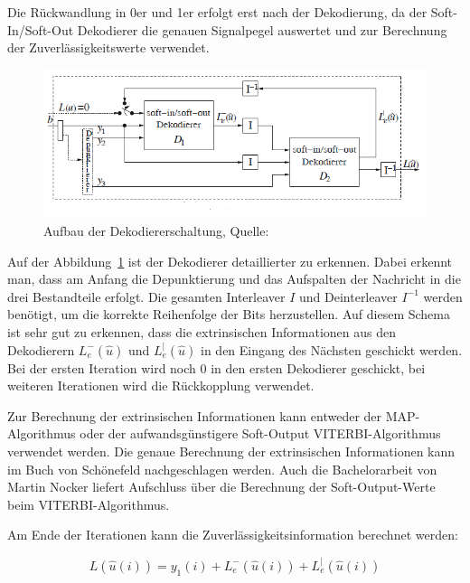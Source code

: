Die Rückwandlung in 0er und 1er erfolgt erst nach der Dekodierung, da der Soft-In/Soft-Out Dekodierer die genauen Signalpegel auswertet und zur Berechnung der Zuverlässigkeitswerte verwendet. 

\begin{figure}[th]
\centering
\includegraphics[width=\ScaleIfNeeded]{pictures/TurboDecoderSchema}
\caption{Aufbau der Dekodiererschaltung, Quelle: \cite[262]{schoenfeld2012informations}}
\label{pic:decoderSchema}
\end{figure}

Auf der Abbildung~\ref{pic:decoderSchema} ist der Dekodierer detaillierter zu erkennen. Dabei erkennt man, dass am Anfang die Depunktierung und das Aufspalten der Nachricht in die drei Bestandteile erfolgt. Die gesamten Interleaver $I$ und Deinterleaver $I^{-1}$ werden benötigt, um die korrekte Reihenfolge der Bits herzustellen. Auf diesem Schema ist sehr gut zu erkennen, dass die extrinsischen Informationen aus den Dekodierern $L^-_e(\widehat{u})$ und $L^|_e(\widehat{u})$ in den Eingang des Nächsten geschickt werden. Bei der ersten Iteration wird noch 0 in den ersten Dekodierer geschickt, bei weiteren Iterationen wird die Rückkopplung verwendet.

Zur Berechnung der extrinsischen Informationen kann entweder der MAP-Algorithmus \cite[233-236]{schoenfeld2012informations} oder der aufwandsgünstigere Soft-Output VITERBI-Algorithmus \cite[222-233]{schoenfeld2012informations} verwendet werden. Die genaue Berechnung der extrinsischen Informationen kann im Buch von Schönefeld \cite[263 f.]{schoenfeld2012informations} nachgeschlagen werden. Auch die Bachelorarbeit von Martin Nocker \cite{nocker} liefert Aufschluss über die Berechnung der Soft-Output-Werte beim VITERBI-Algorithmus.

Am Ende der Iterationen kann die Zuverlässigkeitsinformation berechnet werden:

\begin{equation}
L(\widehat{u}(i))=y_1(i)+L^-_e(\widehat{u}(i))+L^|_e(\widehat{u}(i))
\label{eq:resultDecode}
\end{equation}

